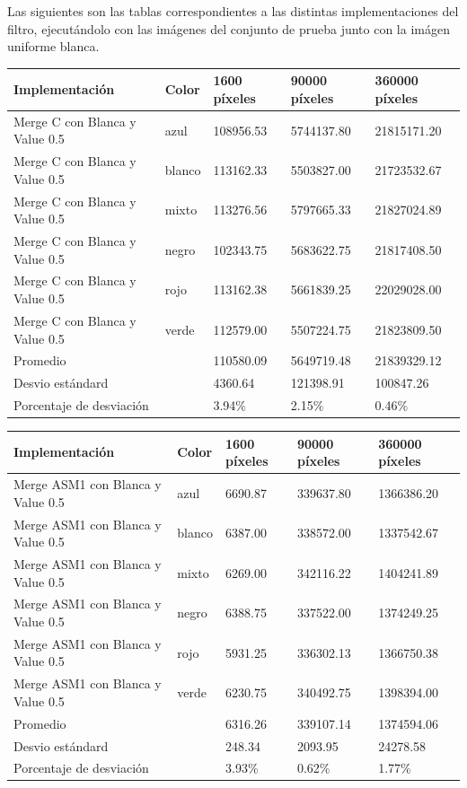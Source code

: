 Las siguientes son las tablas correspondientes a las distintas implementaciones del filtro, ejecutándolo con las imágenes del conjunto de prueba junto con la imágen uniforme blanca.\\

\begin{tabular}{| l | l | l | l | l |}
\hline
Implementación & Color & 1600 píxeles & 90000 píxeles & 360000 píxeles\\
\hline
Merge C con Blanca y Value 0.5 & azul & 108956.53 &	5744137.80	& 21815171.20\\ 
\hline
Merge C con Blanca y Value 0.5 & blanco & 113162.33	& 5503827.00	& 21723532.67\\ 
\hline
Merge C con Blanca y Value 0.5 & mixto & 113276.56	& 5797665.33	& 21827024.89\\ 
\hline
Merge C con Blanca y Value 0.5 & negro & 102343.75	& 5683622.75 &	21817408.50\\
\hline
Merge C con Blanca y Value 0.5 & rojo & 113162.38	& 5661839.25	& 22029028.00\\
\hline
Merge C con Blanca y Value 0.5 & verde & 112579.00	& 5507224.75	& 21823809.50\\ 
\hline
Promedio & &  110580.09	& 5649719.48	& 21839329.12\\
\hline
Desvio estándard  && 4360.64	& 121398.91	& 100847.26\\
\hline
Porcentaje de desviación  && 3.94\%	& 2.15\%	& 0.46\%\\
\hline
\end{tabular}

\begin{tabular}{| l | l | l | l | l |}
\hline
Implementación & Color & 1600 píxeles & 90000 píxeles & 360000 píxeles\\
\hline
Merge ASM1 con Blanca y Value 0.5 & azul & 6690.87	& 339637.80	& 1366386.20\\ 
\hline
Merge ASM1 con Blanca y Value 0.5 & blanco & 6387.00	& 338572.00	& 1337542.67\\ 
\hline
Merge ASM1 con Blanca y Value 0.5 & mixto & 6269.00	& 342116.22 & 	1404241.89\\ 
\hline
Merge ASM1 con Blanca y Value 0.5 & negro & 6388.75 & 337522.00 & 	1374249.25\\
\hline
Merge ASM1 con Blanca y Value 0.5 & rojo & 5931.25	& 336302.13 & 	1366750.38\\
\hline
Merge ASM1 con Blanca y Value 0.5 & verde & 6230.75	& 340492.75	& 1398394.00\\ 
\hline
Promedio & &  6316.26 & 	339107.14 & 	1374594.06\\
\hline
Desvio estándard  && 248.34	& 2093.95	& 24278.58\\
\hline
Porcentaje de desviación  && 3.93\%	& 0.62\% &	1.77\%\\
\hline
\end{tabular}

